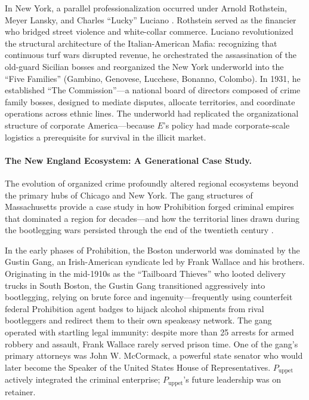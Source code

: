 In New York, a parallel professionalization occurred under Arnold Rothstein, Meyer Lansky, and Charles ``Lucky'' Luciano \cite{ebsco_gangsters}. Rothstein served as the financier who bridged street violence and white-collar commerce. Luciano revolutionized the structural architecture of the Italian-American Mafia: recognizing that continuous turf wars disrupted revenue, he orchestrated the assassination of the old-guard Sicilian bosses and reorganized the New York underworld into the ``Five Families'' (Gambino, Genovese, Lucchese, Bonanno, Colombo). In 1931, he established ``The Commission''---a national board of directors composed of crime family bosses, designed to mediate disputes, allocate territories, and coordinate operations across ethnic lines. The underworld had replicated the organizational structure of corporate America---because $E$'s policy had made corporate-scale logistics a prerequisite for survival in the illicit market.

\paragraph{The New England Ecosystem: A Generational Case Study.}
The evolution of organized crime profoundly altered regional ecosystems beyond the primary hubs of Chicago and New York. The gang structures of Massachusetts provide a case study in how Prohibition forged criminal empires that dominated a region for decades---and how the territorial lines drawn during the bootlegging wars persisted through the end of the twentieth century \cite{wikipedia_gustin, fbi_boston}.

In the early phases of Prohibition, the Boston underworld was dominated by the Gustin Gang, an Irish-American syndicate led by Frank Wallace and his brothers. Originating in the mid-1910s as the ``Tailboard Thieves'' who looted delivery trucks in South Boston, the Gustin Gang transitioned aggressively into bootlegging, relying on brute force and ingenuity---frequently using counterfeit federal Prohibition agent badges to hijack alcohol shipments from rival bootleggers and redirect them to their own speakeasy network. The gang operated with startling legal immunity: despite more than 25 arrests for armed robbery and assault, Frank Wallace rarely served prison time. One of the gang's primary attorneys was John W. McCormack, a powerful state senator who would later become the Speaker of the United States House of Representatives. $P_{\text{uppet}}$ actively integrated the criminal enterprise; $P_{\text{uppet}}$'s future leadership was on retainer.

